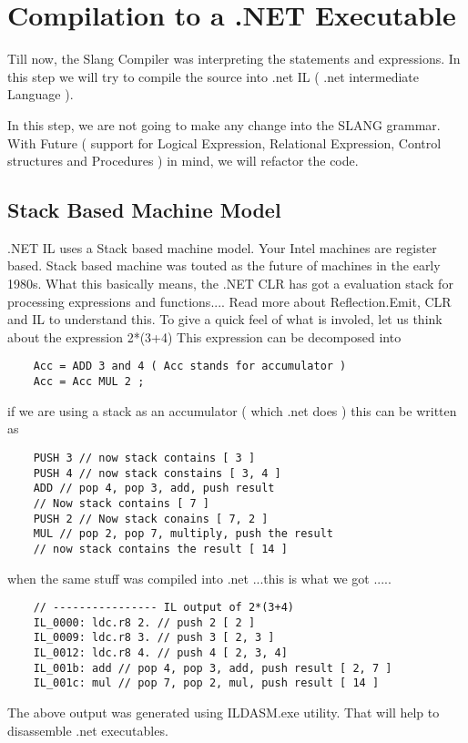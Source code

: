 \chapter{Compilation to a .NET Executable}
Till now, the Slang Compiler was interpreting the statements and expressions. In this step we will try to compile the source into .net IL ( .net intermediate Language ). 

In this step, we are not going to make any change into the SLANG grammar. With Future ( support for Logical Expression, Relational Expression, Control structures and Procedures ) in mind, we will refactor the code. 

\section{Stack Based Machine Model}
.NET IL uses a Stack based machine model. Your Intel machines are register based. Stack based machine was touted as the future of machines in the early 1980s. What this basically means, the .NET CLR has got a evaluation stack for processing expressions and functions.... Read more about Reflection.Emit, CLR and IL to understand this.
To give a quick feel of what is involed, let us think about the expression 2*(3+4) 
This expression can be decomposed into
\lstset{style=csharp}
\begin{lstlisting}
	Acc = ADD 3 and 4 ( Acc stands for accumulator )
	Acc = Acc MUL 2 ;
\end{lstlisting}

if we are using a stack as an accumulator ( which .net does ) this can be written as
\lstset{style=csharp}
\begin{lstlisting}
	PUSH 3 // now stack contains [ 3 ]
	PUSH 4 // now stack constains [ 3, 4 ]
	ADD // pop 4, pop 3, add, push result
	// Now stack contains [ 7 ]
	PUSH 2 // Now stack conains [ 7, 2 ]
	MUL // pop 2, pop 7, multiply, push the result
	// now stack contains the result [ 14 ]
\end{lstlisting}
when the same stuff was compiled into .net ...this is what we got .....
\lstset{style=csharp}
\begin{lstlisting}
	// ---------------- IL output of 2*(3+4)
	IL_0000: ldc.r8 2. // push 2 [ 2 ]
	IL_0009: ldc.r8 3. // push 3 [ 2, 3 ]
	IL_0012: ldc.r8 4. // push 4 [ 2, 3, 4]
	IL_001b: add // pop 4, pop 3, add, push result [ 2, 7 ]
	IL_001c: mul // pop 7, pop 2, mul, push result [ 14 ]
\end{lstlisting}
The above output was generated using ILDASM.exe utility. That will help to disassemble .net executables.
